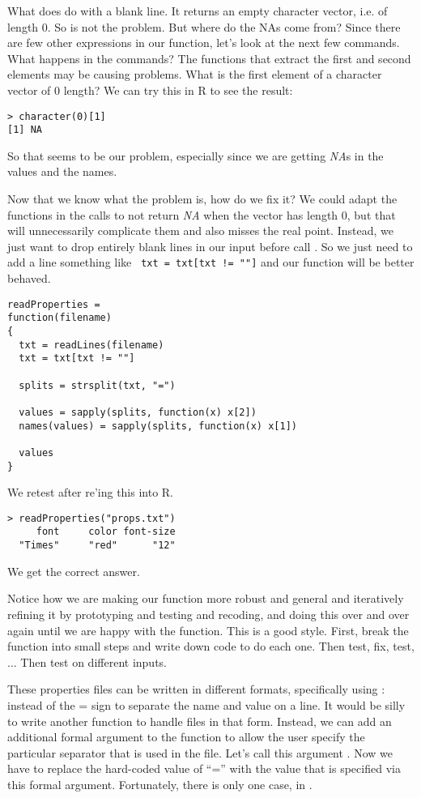 {What does  do with a blank line. It returns an
empty character vector, i.e. of length 0. So  is
not the problem. But where do the NAs come from? Since there are few
other expressions in our function, let's look at the next few
commands. What happens in the  commands? The
functions that extract the first and second elements may be causing
problems. What is the first element of a character vector of 0 length?
We can try this in R to see the result:
\begin{verbatim}
> character(0)[1]
[1] NA
\end{verbatim}
So that seems to be our problem, especially since we are getting
\textit{NA}s in the values and the names.

Now that we know what the problem is, how do we fix it? We could
adapt the functions in the  calls to not return
\textit{NA} when the vector has length 0, but that will unnecessarily
complicate them and also misses the real point. Instead, we just want
to drop entirely blank lines in our input before call
. So we just need to add a line something like
\verb| txt = txt[txt != ""]| and our function will be better behaved.
\begin{verbatim}
readProperties =
function(filename) 
{
  txt = readLines(filename)
  txt = txt[txt != ""]

  splits = strsplit(txt, "=")

  values = sapply(splits, function(x) x[2])
  names(values) = sapply(splits, function(x) x[1])

  values
}
\end{verbatim}
We retest after re'ing this into R. 
\begin{verbatim}
> readProperties("props.txt")
     font     color font-size 
  "Times"     "red"      "12" 
\end{verbatim}
We get the correct answer. 

Notice how we are making our function more robust and general and
iteratively refining it by prototyping and testing and recoding, and
doing this over and over again until we are happy with the
function. This is a good style. First, break the function into
small steps and write down code to do each one. Then test, fix, test,
... Then test on different inputs.

These properties files can be written in different formats,
specifically using : instead of the = sign to separate the name and
value on a line. It would be silly to write another function to handle
files in that form. Instead, we can add an additional formal argument
to the function to allow the user specify the particular separator
that is used in the file. Let's call this argument . Now
we have to replace the hard-coded value of ``='' with the value that is
specified via this formal argument. Fortunately, there is only one
case, in .

}
